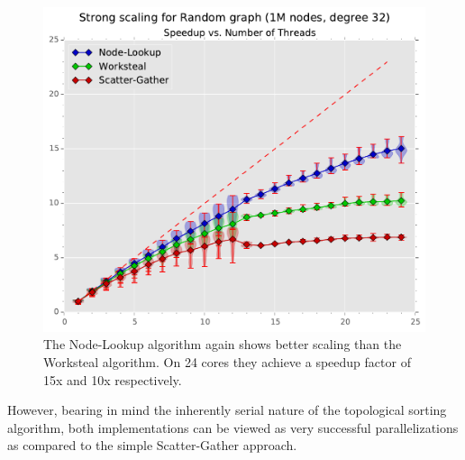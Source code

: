 %
\begin{figure}[ht]
	\centering
	\includegraphics[width=\columnwidth]{plots/strongscaling_gtRANDOMLIN_n1000000_deg32.pdf}
	\caption{The Node-Lookup algorithm again shows better scaling than the Worksteal algorithm. On 24 cores they achieve a speedup factor of 15x and 10x respectively.}
	\label{fig:strongscaling}
\end{figure}
%
However, bearing in mind the inherently serial nature of the topological sorting algorithm, both implementations can be viewed as very successful parallelizations as compared to the simple Scatter-Gather approach.




